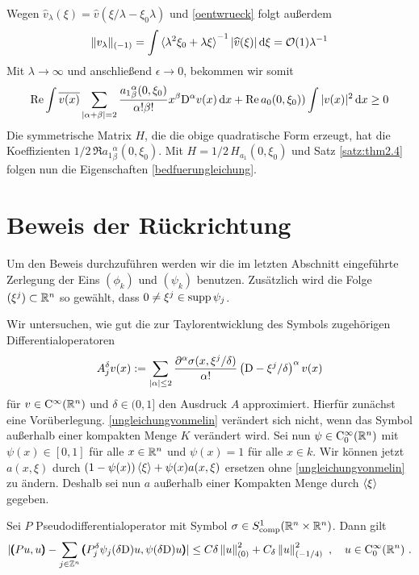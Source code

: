 Wegen $\widehat{v}_\lambda(\xi)=\widehat{v}(\xi/\lambda-\xi_0\lambda)$ und \eqref{oentwrueck} folgt außerdem
\begin{align}
\|v_\lambda\|_{(-1)} = \int \braket{\lambda^2\xi_0+\lambda \xi}^{-1}|\widehat{v}(\xi)|\,\mathrm d\xi = \mathcal{O}(1)\lambda^{-1} 
\end{align}
Mit $\lambda\to\infty$ und anschließend $\epsilon \to 0$, bekommen wir somit
\begin{align}
\operatorname{Re}\int \overline{v(x)}\sum_{\lvert\alpha+\beta\rvert=2}\frac{{a_1}^\alpha_\beta(0,\xi_0)}{\alpha!\beta!}x^\beta\mathrm D^\alpha v(x)\,\mathrm d x + \operatorname{Re} a_0(0,\xi_0))\int|v(x)|^2\,\mathrm d x\ge 0
\end{align}
Die symmetrische Matrix $H$, die die obige quadratische Form erzeugt, hat die Koeffizienten $1/2\,\Re {a_1}^\alpha_\beta(0,\xi_0)$. Mit $H=1/2\, H_{a_1}(0,\xi_0)$ und Satz \ref{satz:thm2.4} folgen nun die Eigenschaften \eqref{bedfuerungleichung}.

\section{Beweis der Rückrichtung}

Um den Beweis durchzuführen werden wir die im letzten Abschnitt eingeführte Zerlegung der Eins $(\phi_k)$ und $(\psi_k)$ benutzen. Zusätzlich wird die Folge $(\xi^j)\subset \mathbb R^n$ so gewählt, dass $0\neq \xi^j\in\operatorname{supp} \psi_j$.

Wir untersuchen, wie gut die zur Taylorentwicklung des Symbols zugehörigen Differentialoperatoren
\begin{align}
 A_j^\delta v (x):=\sum_{\lvert\alpha\rvert \le 2} \frac{\partial ^\alpha\sigma(x,\xi^j/\delta)}{\alpha!}\left( \mathrm D - \xi^j/\delta\right)^\alpha v(x)
\end{align}
für $v\in\mathrm {C}^\infty(\mathbb R^n)$ und $\delta\in(0,1]$ den Ausdruck $A$ approximiert. Hierfür zunächst eine Vorüberlegung. \eqref{ungleichungvonmelin} verändert sich nicht, wenn das Symbol außerhalb einer kompakten Menge $K$ verändert wird. Sei nun $\psi\in\mathrm{C}^\infty_0(\mathbb R^n)$ mit $\psi(x)\in[0,1]$ für alle $x\in\mathbb R^n$ und $\psi(x)=1$ für alle $x\in k$. Wir können jetzt $a(x,\xi)$ durch $(1-\psi(x))\braket{\xi} + \psi(x)a(x,\xi)$ ersetzen ohne \eqref{ungleichungvonmelin} zu ändern. Deshalb sei nun $a$ außerhalb einer Kompakten Menge durch $\braket{\xi}$ gegeben.

\begin{lem}
Sei $P$ Pseudodifferentialoperator mit Symbol $\sigma\in S^1_{\rm comp}(\mathbb R^n\times\mathbb R^n)$. Dann gilt
\begin{align}\label{hilfsungl1}
\lvert
\pmb(P u,u\pmb) - \sum_{j\in\mathbb Z^n}\pmb( P_j^\delta\psi_j(\delta\mathrm D )u, \psi(\delta\mathrm D )u \pmb)
\rvert
\le C\delta \left\lVert u\right\rVert ^2_{(0)} + C_\delta \left\lVert u\right\rVert ^2_{(-1/4)}\ ,\quad u\in\mathrm {C}^\infty_0(\mathbb R^n)\ .
\end{align}
\end{lem}

